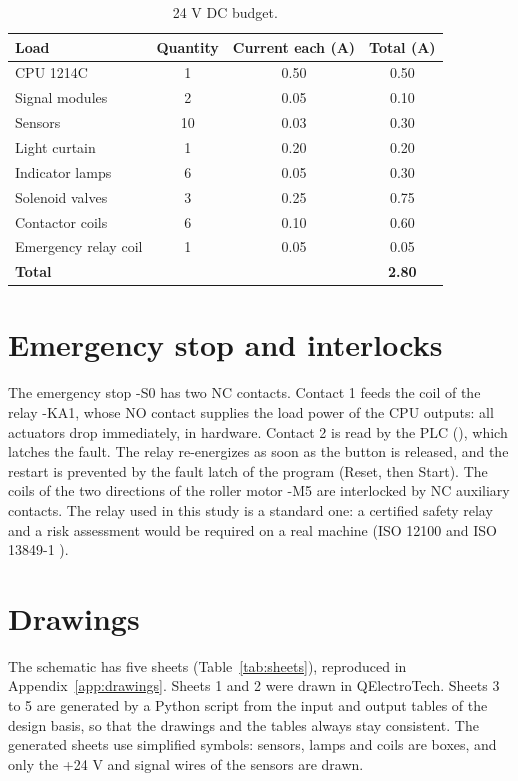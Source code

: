 \documentclass[11pt,a4paper]{report}
\newcommand{\tg}[1]{\texttt{\detokenize{#1}}}
\begin{document}
\begin{table}[H]
\centering\small
\caption{24 V DC budget.}\label{tab:budget}
\begin{tabular}{@{}lccc@{}}
\toprule
\textbf{Load} & \textbf{Quantity} & \textbf{Current each (A)} & \textbf{Total (A)}\\
\midrule
CPU 1214C & 1 & 0.50 & 0.50\\
Signal modules & 2 & 0.05 & 0.10\\
Sensors & 10 & 0.03 & 0.30\\
Light curtain & 1 & 0.20 & 0.20\\
Indicator lamps & 6 & 0.05 & 0.30\\
Solenoid valves & 3 & 0.25 & 0.75\\
Contactor coils & 6 & 0.10 & 0.60\\
Emergency relay coil & 1 & 0.05 & 0.05\\
\midrule
\textbf{Total} & & & \textbf{2.80}\\
\bottomrule
\end{tabular}
\end{table}

\section{Emergency stop and interlocks}
The emergency stop -S0 has two NC contacts. Contact 1 feeds the coil of the relay -KA1, whose NO contact supplies the load power of the CPU outputs: all actuators drop immediately, in hardware. Contact 2 is read by the PLC (\tg{I_EmergencyStop}), which latches the fault. The relay re-energizes as soon as the button is released, and the restart is prevented by the fault latch of the program (Reset, then Start). The coils of the two directions of the roller motor -M5 are interlocked by NC auxiliary contacts. The relay used in this study is a standard one: a certified safety relay and a risk assessment would be required on a real machine (ISO 12100 and ISO 13849-1 \cite{iso13849}).

\section{Drawings}
The schematic has five sheets (Table~\ref{tab:sheets}), reproduced in Appendix~\ref{app:drawings}. Sheets 1 and 2 were drawn in QElectroTech. Sheets 3 to 5 are generated by a Python script from the input and output tables of the design basis, so that the drawings and the tables always stay consistent. The generated sheets use simplified symbols: sensors, lamps and coils are boxes, and only the +24 V and signal wires of the sensors are drawn.
\end{document}
